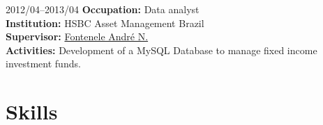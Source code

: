 \documentclass[a4paper]{article}
\begin{document}
\begin{CV}



\item[2012/04--2013/04] \textbf{Occupation:} Data analyst
  \\ \textbf{Institution:} HSBC Asset Management Brazil
  \\ \textbf{Supervisor:} \href{https://br.linkedin.com/in/andrefontenele}{Fontenele André N.}
  \\ \textbf{Activities:} Development of a MySQL Database to manage fixed income
  investment funds.


\end{CV}

\section{Skills}
\end{document}
